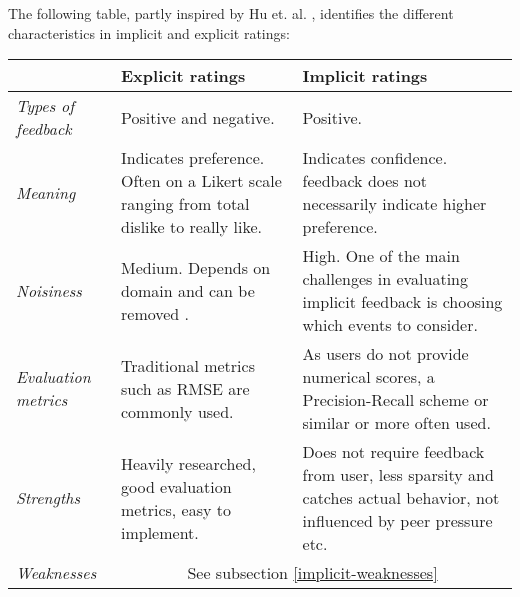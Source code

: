 The following table, partly inspired by Hu et. al. \cite{Hu2008}, identifies
the different characteristics in implicit and explicit ratings:

\begin{table}[H]
    \begin{tabular}{|l|p{6cm}|p{6cm}|}
    \hline
    ~                  & \textbf{Explicit ratings}
                       & \textbf{Implicit ratings} \\ \hline

    \textit{Types of feedback}  
                       & Positive and negative.
                       & Positive. \\ \hline

    \textit{Meaning}
                       & Indicates preference. Often on a Likert scale ranging
                         from total dislike to really like.
                       & Indicates confidence. %
                         feedback does not necessarily indicate higher
                         preference. \\ \hline

    \textit{Noisiness}
                       & Medium. Depends on domain and can be removed 
                         \cite{amatriain2009like}.
                       & High. One of the main challenges in evaluating
                         implicit feedback is choosing which events to
                         consider. \\ \hline

    \textit{Evaluation metrics}
                       & Traditional metrics such as RMSE are commonly used.
                       & As users do not provide numerical scores, a
                         Precision-Recall scheme or similar or more often used.
                         \\ \hline

    \textit{Strengths}
                       & Heavily researched, good evaluation metrics, easy to
                         implement.
                       & Does not require feedback from user, less sparsity and
                         catches actual behavior, not influenced by peer
                         pressure etc. \\ \hline

    \textit{Weaknesses}
                       & \multicolumn{2}{c|}{See subsection \ref{implicit-weaknesses}} \\ \hline
    \end{tabular}
\end{table}

